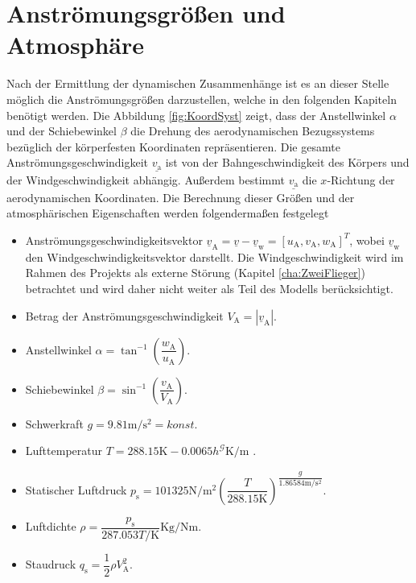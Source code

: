 \section{Anströmungsgrößen und Atmosphäre}
\label{sec:atmospäre}
Nach der Ermittlung der dynamischen Zusammenhänge ist es an dieser Stelle möglich die Anströmungsgrö{\ss}en darzustellen, welche in den folgenden Kapiteln benötigt werden. Die Abbildung \ref{fig:KoordSyst} zeigt, dass der Anstellwinkel $\alpha$ und der Schiebewinkel $\beta$ die Drehung des aerodynamischen Bezugssystems bezüglich der körperfesten Koordinaten repräsentieren. Die gesamte Anströmungsgeschwindigkeit $\underline{v_\mathrm{a}}$ ist von der Bahngeschwindigkeit des Körpers und der Windgeschwindigkeit abhängig. Au{\ss}erdem bestimmt $\underline{v_\mathrm{a}}$ die $x$-Richtung der aerodynamischen Koordinaten. Die Berechnung dieser Grö{\ss}en und der atmosphärischen Eigenschaften werden folgenderma{\ss}en festgelegt
\begin{itemize}
\item Anströmungsgeschwindigkeitsvektor $\underline{v}_\mathrm{A} = \underline{v}- \underline{v}_\mathrm{w}  = [u_\mathrm{A},v_\mathrm{A},w_\mathrm{A}]^T $, wobei $\underline{v}_\mathrm{w}$ den Windgeschwindigkeitsvektor darstellt. Die Windgeschwindigkeit wird im Rahmen des Projekts als externe Störung (Kapitel \ref{cha:ZweiFlieger}) betrachtet  und wird daher nicht weiter als Teil des Modells berücksichtigt.  
\item Betrag der Anströmungsgeschwindigkeit $V_\mathrm{A} = |\underline{v}_\mathrm{A}| $.
\item Anstellwinkel $\alpha = \tan^{-1}\left(\dfrac{w_\mathrm{A}}{u_\mathrm{A}}\right)$.
\item Schiebewinkel $\beta = \sin^{-1}\left(\dfrac{v_\mathrm{A}}{V_\mathrm{A}}\right)$.
\item Schwerkraft $g = 9.81 \mathrm{m/s^2} = konst.$
\item Lufttemperatur $ T = 288.15 \mathrm{K} - 0.0065h^\mathcal{G}\mathrm{K/m}$  \cite{AircraftCS}.
\item Statischer Luftdruck $p_\mathrm{s} = 101325\mathrm{N/m^2}\left(\dfrac{T}{288.15  \mathrm{K}}\right)^{\dfrac{g}{1.86584 \mathrm{m/s^2}}}$.
\item Luftdichte $\rho = \dfrac{p_\mathrm{s}}{287.053T/\mathrm{K}} \mathrm{Kg/Nm}$.
\item Staudruck $q_\mathrm{s} = \dfrac{1}{2}\rho V_\mathrm{A}^2$.

\end{itemize}
